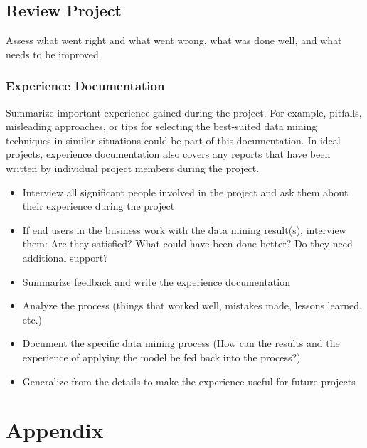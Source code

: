 \documentclass[
]{article}
\providecommand{\tightlist}{%
  \setlength{\itemsep}{0pt}\setlength{\parskip}{0pt}}
\begin{document}
\hypertarget{review-project}{%
\subsection{Review Project}\label{review-project}}

Assess what went right and what went wrong, what was done well, and what
needs to be improved.

\hypertarget{experience-documentation}{%
\subsubsection{Experience
Documentation}\label{experience-documentation}}

Summarize important experience gained during the project. For example,
pitfalls, misleading approaches, or tips for selecting the best-suited
data mining techniques in similar situations could be part of this
documentation. In ideal projects, experience documentation also covers
any reports that have been written by individual project members during
the project.

\begin{itemize}
\tightlist
\item
  Interview all significant people involved in the project and ask them
  about their experience during the project
\item
  If end users in the business work with the data mining result(s),
  interview them: Are they satisfied? What could have been done better?
  Do they need additional support?
\item
  Summarize feedback and write the experience documentation
\item
  Analyze the process (things that worked well, mistakes made, lessons
  learned, etc.)
\item
  Document the specific data mining process (How can the results and the
  experience of applying the model be fed back into the process?)
\item
  Generalize from the details to make the experience useful for future
  projects
\end{itemize}

\hypertarget{appendix}{%
\section{Appendix}\label{appendix}}
\end{document}
